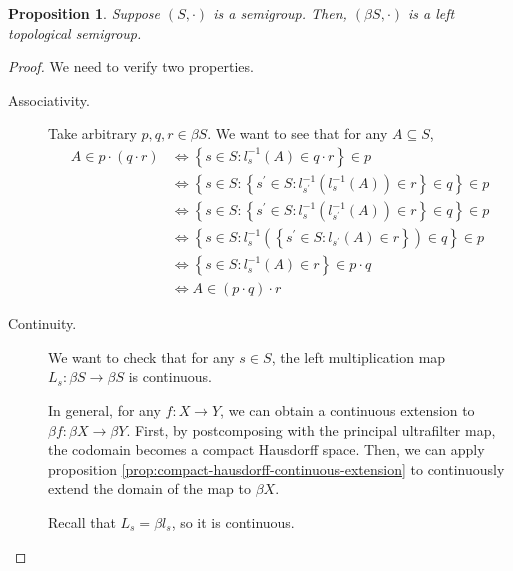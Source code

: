 \documentclass[11pt,letterpaper]{article}
\newtheorem{prop}{Proposition}
\newcommand{\inv}{^{-1}}
\newcommand{\parens}[1]{\left(#1\right)}
\newcommand{\setof}[1]{\left\{#1\right\}}
\begin{document}
\begin{prop}
    Suppose $(S, \cdot)$ is a semigroup. Then, $(\beta S, \cdot)$ is a left
    topological semigroup.
\end{prop}

\begin{proof}
    We need to verify two properties.

    \begin{description}
        \item[Associativity.]
            Take arbitrary $p, q, r \in \beta S$.
            We want to see that for any $A \subseteq S$,
            \begin{align*}
                A \in p \cdot (q \cdot r)
                & \iff
                \setof{
                    s \in S :
                    l_s\inv (A) \in q \cdot r
                }
                \in p \\
                & \iff
                \setof{
                    s \in S :
                    \setof{
                        s^\prime \in S :
                        l_{s^\prime}\inv ( l_s\inv (A) )
                        \in r
                    }
                    \in q
                }
                \in p \\
                & \iff
                \setof{
                    s \in S :
                    \setof{
                        s^\prime \in S :
                        l_s\inv ( l_{s^\prime}\inv (A) )
                        \in r
                    }
                    \in q
                }
                \in p \\
                & \iff
                \setof{
                    s \in S :
                    l_s\inv \parens{
                        \setof{
                            s^\prime \in S :
                            l_{s^\prime} (A)
                            \in r
                        }
                    }
                    \in q
                }
                \in p \\
                & \iff
                \setof{
                    s \in S :
                    l_s\inv (A) \in r
                }
                \in p \cdot q \\
                & \iff
                A \in (p \cdot q) \cdot r
            \end{align*}

        \item[Continuity.]
            We want to check that for any $s \in S$, the left multiplication
            map $L_s : \beta S \to \beta S$ is continuous.

            In general, for any $f : X \to Y$, we can obtain a continuous
            extension to $\beta f : \beta X \to \beta Y$. First, by
            postcomposing with the principal ultrafilter map, the codomain
            becomes a compact Hausdorff space. Then, we can apply proposition
            \ref{prop:compact-hausdorff-continuous-extension} to continuously
            extend the domain of the map to $\beta X$.

            Recall that $L_s = \beta l_s$, so it is continuous.
    \end{description}
\end{proof}
\end{document}
